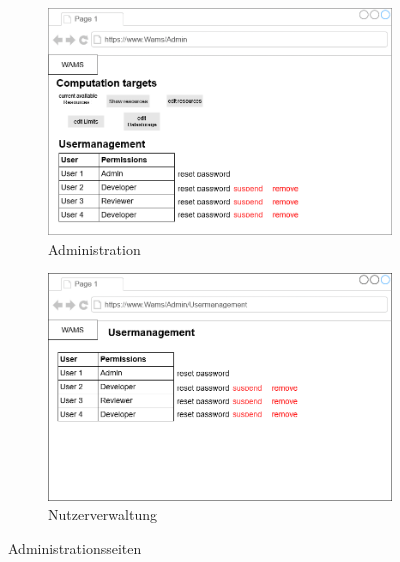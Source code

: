 \begin{figure}[ht]
    \centering
    \begin{subfigure}{.75\textwidth}
        \centering
        \includegraphics[width = \textwidth]{Grafiken/Gui Mockups/workflowGui-admin.drawio.png}
        \caption{Administration}
        \label{fig:sfig1}
    \end{subfigure}
   \begin{subfigure}{.75\textwidth}
    \centering
    \includegraphics[width = \textwidth]{Grafiken/Gui Mockups/nutzerverwaltungGui.drawio.png}
    \caption{Nutzerverwaltung}
    \label{fig:sfig2}
   \end{subfigure}
   \caption{Administrationsseiten}
   \label{fig:Abb 3}
\end{figure}
    
